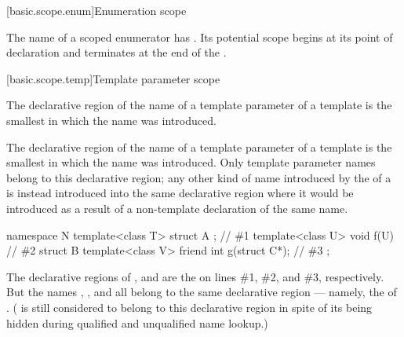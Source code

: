 [basic.scope.enum]{Enumeration scope}%
%

\pnum
The name of a scoped enumerator has
. Its potential scope begins at
its point of declaration and terminates at the end of the
.

[basic.scope.temp]{Template parameter scope}%
%
%

\pnum
The declarative region of the name of a template parameter of a template
 is the smallest 
in which the name was introduced.

\pnum
The declarative region of the name of a template parameter of a template is the smallest
 in which the name was introduced. Only template
parameter names belong to this declarative region; any other kind of name introduced by
the  of a  is instead
introduced into the same declarative region where it would be introduced as a result of
a non-template declaration of the same name. \begin{example}

\begin{codeblock}
namespace N {
  template<class T> struct A { };               // \#1
  template<class U> void f(U) { }               // \#2
  struct B {
    template<class V> friend int g(struct C*);  // \#3
  };
}
\end{codeblock}

The declarative regions of ,  and  are the
 on lines \#1, \#2, and \#3,
respectively. But the names , ,  and  all belong to
the same declarative region --- namely, the  of .
( is still considered to belong to this declarative region in spite of its
being hidden during qualified and unqualified name lookup.)
\end{example}

